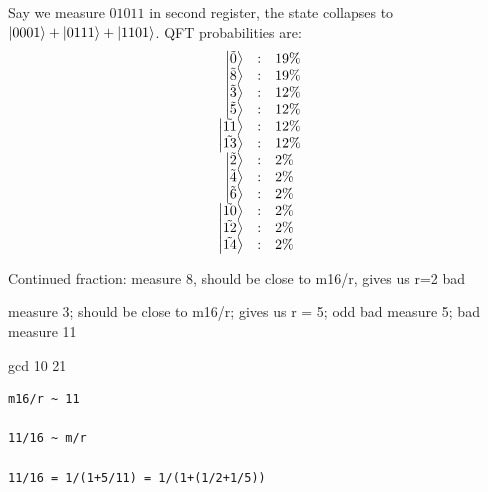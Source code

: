 \documentclass{article}
\newcommand{\qket}[1]{\ket{\tilde{#1}}}
\begin{document}
Say we measure $01011$ in second register, the state collapses to
$\ket{0001}+\ket{0111}+\ket{1101}$. QFT probabilities are:
\[\begin{array}{rcl}
\qket{0} &:& 19\% \\
\qket{8} &:& 19\% \\
\qket{3} &:& 12\% \\
\qket{5} &:& 12\% \\
\qket{11} &:& 12\% \\
\qket{13} &:& 12\% \\
\qket{2} &:& 2\% \\
\qket{4} &:& 2\% \\
\qket{6} &:& 2\% \\
\qket{10} &:& 2\% \\
\qket{12} &:& 2\% \\
\qket{14} &:& 2\% 
\end{array}\]

Continued fraction: measure 8, should be close to m16/r, gives us r=2 bad

measure 3; should be close to m16/r; gives us r = 5; odd bad
measure 5; bad
measure 11

gcd 10 21
\begin{verbatim}
m16/r ~ 11

11/16 ~ m/r

11/16 = 1/(1+5/11) = 1/(1+(1/2+1/5))


\end{verbatim}


\printbibliography
\end{document}
